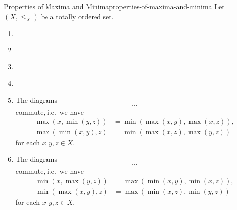 \begin{proposition}{Properties of Maxima and Minima}{properties-of-maxima-and-minima}%
    Let $(X,\leq_{X})$ be a totally ordered set.
    \begin{enumerate}
        \item\label{properties-of-maxima-and-minima-unitality}
        \item\label{properties-of-maxima-and-minima-associativity}
        \item\label{properties-of-maxima-and-minima-commutativity}
        \item\label{properties-of-maxima-and-minima-idempotency}
        \item\label{properties-of-maxima-and-minima-distributivity-of-maxima-over-minima}The diagrams
            \[
                \cdots%
            \]%
            commute, i.e.\ we have
            \begin{align*}
                \max(x,\min(y,z)) &= \min(\max(x,y),\max(x,z)),\\
                \max(\min(x,y),z) &= \min(\max(x,z),\max(y,z))%
            \end{align*}
            for each $x,y,z\in X$.
        \item\label{properties-of-maxima-and-minima-distributivity-of-minima-over-maxima}The diagrams
            \[
                \cdots%
            \]%
            commute, i.e.\ we have
            \begin{align*}
                \min(x,\max(y,z)) &= \max(\min(x,y),\min(x,z)),\\
                \min(\max(x,y),z) &= \max(\min(x,z),\min(y,z))%
            \end{align*}
            for each $x,y,z\in X$.

\end{enumerate}
\end{proposition}
